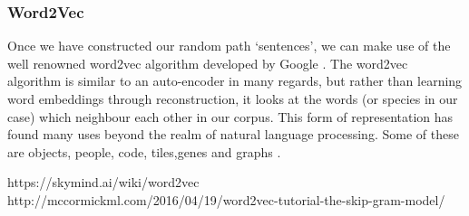 \subsubsection{Word2Vec}
Once we have constructed our random path `sentences', we can make use of the well renowned word2vec algorithm developed by Google \citep{w2v}. The word2vec algorithm is similar to an auto-encoder in many regards, but rather than learning word embeddings through reconstruction, it looks at the words (or species in our case) which neighbour each other in our corpus. This form of representation has found many uses beyond the realm of natural language processing. Some of these are objects, people, code, tiles,genes and graphs \citep{objects,people,code,tile,gene,graph2vec}.



https://skymind.ai/wiki/word2vec
http://mccormickml.com/2016/04/19/word2vec-tutorial-the-skip-gram-model/
